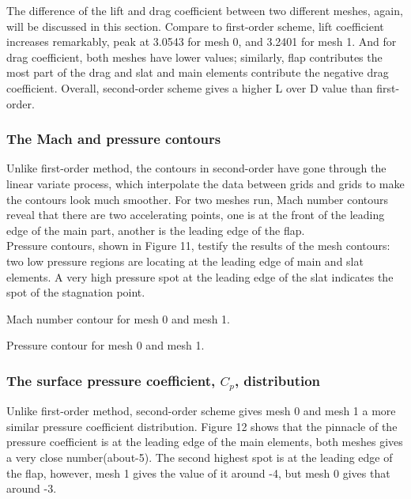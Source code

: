 \documentclass[letterpaper,onecolumn,12pt]{article}
\makeatletter
\newenvironment{figurehere}
  {\def\@captype{figure}}{}
\makeatother
\begin{document}
\bigskip

The difference of the lift and drag coefficient between two different meshes, again, will be discussed in this section. Compare to first-order scheme, lift coefficient increases remarkably, peak at 3.0543 for mesh 0, and 3.2401 for mesh 1. And for drag coefficient, both meshes have lower values; similarly, flap contributes the most part of the drag and slat and main elements contribute the negative drag coefficient. Overall, second-order scheme gives a higher L over D value than first-order. 

\subsubsection{The Mach and pressure contours}
Unlike first-order method, the contours in second-order have gone through the linear variate process, which interpolate the data between grids and grids to make the contours look much smoother.  For two meshes run, Mach number contours reveal that there are two accelerating points, one is at the front of the leading edge of the main part, another is the leading edge of the flap.\\

Pressure contours, shown in Figure 11, testify the results of the mesh contours: two low pressure regions are locating at the leading edge of main and slat elements. A very high pressure spot at the leading edge of the slat indicates the spot of the stagnation point. 

\begin{figurehere}
 \centering 
  \hspace{.05cm} 
  \caption{Mach number contour for mesh 0 and mesh 1.} 
\end{figurehere}

\begin{figurehere}
 \centering 
  \hspace{.05cm} 
  \caption{Pressure contour for mesh 0 and mesh 1.} 
\end{figurehere}


\subsubsection{The surface pressure coefficient, $C_p$, distribution}
Unlike first-order method, second-order scheme gives mesh 0 and mesh 1 a more similar pressure coefficient distribution. Figure 12 shows that the pinnacle of the pressure coefficient is at the leading edge of the main elements, both meshes gives a very close number(about-5). The second highest spot is at the leading edge of the flap, however, mesh 1 gives the value of it around -4, but mesh 0 gives that around -3. 
\end{document}
